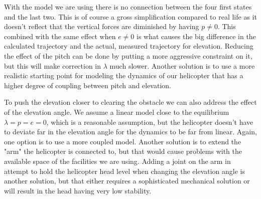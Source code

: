 With the model we are using there is no connection between the four first states and the last two. This is of course a gross simplification compared to real life as it doesn't reflect that the vertical forces are diminished by having $p \neq 0$. This combined with the same effect when $e \neq 0$ is what causes the big difference in the calculated trajectory and the actual, measured trajectory for elevation. Reducing the effect of the pitch can be done by putting a more aggressive constraint on it, but this will make correction in $\lambda$ much slower. Another solution is to use a more realistic starting point for modeling the dynamics of our helicopter that has a higher degree of coupling between pitch and elevation.

To push the elevation closer to clearing the obstacle we can also address the effect of the elevation angle. We assume a linear model close to the equilibrium $\lambda = p = e = 0$, which is a reasonable assumption, but the helicopter doesn't have to deviate far in the elevation angle for the dynamics to be far from linear. Again, one option is to use a more coupled model. Another solution is to extend the "arm" the helicopter is connected to, but that would cause problems with the available space of the facilities we are using. Adding a joint on the arm in attempt to hold the helicopter head level when changing the elevation angle is another solution, but that either requires a sophisticated mechanical solution or will result in the head having very low stability.

